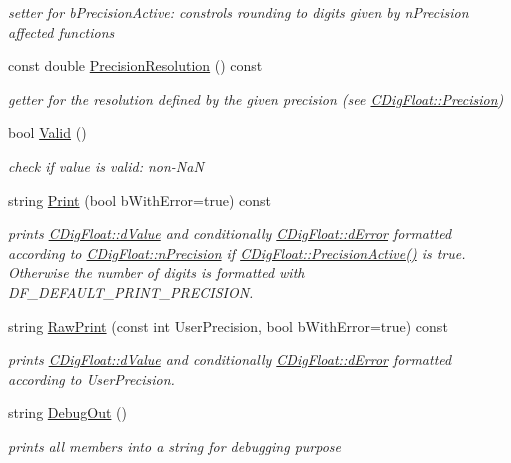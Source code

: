 \begin{DoxyCompactItemize}
\begin{DoxyCompactList}\small\item\em setter for b\+Precision\+Active\+: constrols rounding to digits given by n\+Precision affected functions \end{DoxyCompactList}\item 
const double \hyperlink{classCDigFloat_ad39db10046bbfd27c2537581bdb7e073}{Precision\+Resolution} () const
\begin{DoxyCompactList}\small\item\em getter for the resolution defined by the given precision (see \hyperlink{classCDigFloat_a95875f6f7246debee0d00b0c41c82aee}{C\+Dig\+Float\+::\+Precision}) \end{DoxyCompactList}\item 
bool \hyperlink{classCDigFloat_aab339f7e1ffa5c88f3dbb432389752c9}{Valid} ()
\begin{DoxyCompactList}\small\item\em check if value is valid\+: non-\/\+NaN \end{DoxyCompactList}\item 
string \hyperlink{classCDigFloat_a80731e0970f607114d6d1bde4d02bd39}{Print} (bool b\+With\+Error=true) const
\begin{DoxyCompactList}\small\item\em prints \hyperlink{classCDigFloat_a4bbe69e30dd4e20527362493aa9aaf96}{C\+Dig\+Float\+::d\+Value} and conditionally \hyperlink{classCDigFloat_a25eb3782d1e727ff007a48f8308e3d4d}{C\+Dig\+Float\+::d\+Error} formatted according to \hyperlink{classCDigFloat_ad580654be35246d14c91482581c0bc11}{C\+Dig\+Float\+::n\+Precision} if \hyperlink{classCDigFloat_a4d6ca24beda280be719374c2a6b2c64d}{C\+Dig\+Float\+::\+Precision\+Active()} is true. Otherwise the number of digits is formatted with D\+F\+\_\+\+D\+E\+F\+A\+U\+L\+T\+\_\+\+P\+R\+I\+N\+T\+\_\+\+P\+R\+E\+C\+I\+S\+I\+ON. \end{DoxyCompactList}\item 
string \hyperlink{classCDigFloat_a7051716ffe1294bab6ed6e194a73618e}{Raw\+Print} (const int User\+Precision, bool b\+With\+Error=true) const
\begin{DoxyCompactList}\small\item\em prints \hyperlink{classCDigFloat_a4bbe69e30dd4e20527362493aa9aaf96}{C\+Dig\+Float\+::d\+Value} and conditionally \hyperlink{classCDigFloat_a25eb3782d1e727ff007a48f8308e3d4d}{C\+Dig\+Float\+::d\+Error} formatted according to User\+Precision. \end{DoxyCompactList}\item 
string \hyperlink{classCDigFloat_a006a43f81560e2429dce9aca7742a4e7}{Debug\+Out} ()
\begin{DoxyCompactList}\small\item\em prints all members into a string for debugging purpose \end{DoxyCompactList}\end{DoxyCompactItemize}
